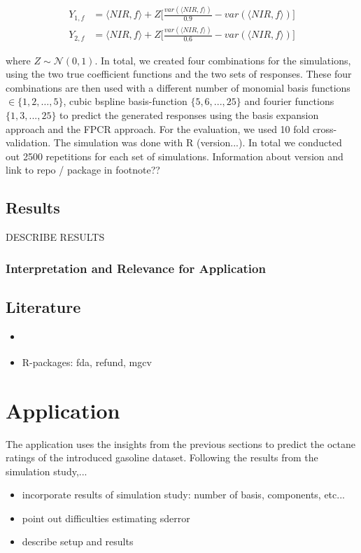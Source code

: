 \documentclass[11pt,twoside,a4paper]{article}
\begin{document}
		\begin{equation}
			\begin{split}
				Y_{1,f} & = \langle NIR, f\rangle + Z  \biggl\lbrack\frac{var(\langle NIR, f\rangle)}{0.9} - var(\langle NIR, f\rangle)\biggr\rbrack \\
				Y_{2,f} & = \langle NIR, f\rangle + Z  \biggl\lbrack\frac{var(\langle NIR, f\rangle)}{0.6} - var(\langle NIR, f\rangle)\biggr\rbrack
			\end{split}
		\end{equation}
		
		where $Z \sim \mathcal{N}(0,1)$. In total, we created four combinations for the simulations, using the two true coefficient functions and the two sets of responses. These four combinations are then used with a different number of monomial basis functions $ \in \{1,2, \dots, 5\}$, cubic bspline basis-function $\{5,6,...,25\}$ and fourier functions $\{1,3,...,25\}$ to predict the generated responses using the basis expansion approach and the FPCR approach. For the evaluation, we used 10 fold cross-validation. The simulation was done with R (version...). In total we conducted out 2500 repetitions for each set of simulations. {\color{green} Information about version and link to repo / package in footnote??}
		
	
	\subsection{Results}
	DESCRIBE RESULTS

	\subsubsection{Interpretation and Relevance for Application}

	\subsection{Literature}
	\begin{itemize}
		\item \cite{shonkwiler_explorations_2009}
		\item R-packages: fda, refund, mgcv
	\end{itemize}
	
	\newpage
	\section{Application}
The application uses the insights from the previous sections to predict the octane ratings of the introduced gasoline dataset. Following the results from the simulation study,... 
\begin{itemize}
\item
{\color{green} incorporate results of simulation study: number of basis, components, etc...}
\item
point out difficulties estimating sderror
\item
describe setup and results
\end{itemize}
\end{document}
